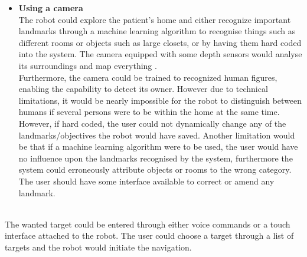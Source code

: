 \documentclass[plainarticle,zihtitle,english,final,hyperref,utf8]{zihpub}
\begin{document}
\begin{itemize}
\item \textbf{Using a camera}\\
The robot could explore the patient’s home and either recognize important landmarks through a machine learning algorithm to recognise things such as different rooms or objects such as large closets, or by having them hard coded into the system. The camera equipped with some depth sensors would analyse its surroundings and map everything \cite{6224766}.\\
\newline
Furthermore, the camera could be trained to recognized human figures, enabling the capability to detect its owner. However due to technical limitations, it would be nearly impossible for the robot to distinguish between humans if several persons were to be within the home at the same time.\\
\newline
However, if hard coded, the user could not dynamically change any of the landmarks/objectives the robot would have saved. Another limitation would be that if a machine learning algorithm were to be used, the user would have no influence upon the landmarks recognised by the system, furthermore the system could erroneously attribute objects or rooms to the wrong category. The user should have some interface available to correct or amend any landmark.\\
\end{itemize}

\\
\newline
The wanted target could be entered through either voice commands or a touch interface attached to the robot. The user could choose a target through a list of targets and the robot would initiate the navigation.\\
\end{document}
